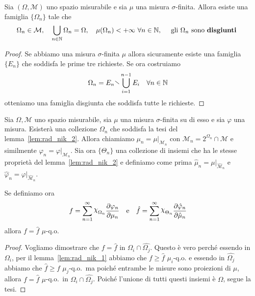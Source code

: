 \begin{lemma}\label{lem:rad_nik_2}
    Sia \({(\Omega, \mathcal{M})}\) uno spazio misurabile e sia \(\mu\) una
    misura \(\sigma\)-finita. Allora esiste una famiglia \(\{\Omega_n\}\) tale
    che 
    \[
        \Omega_n \in \mathcal{M}, \quad \bigcup_{n \in \mathbb{N}} \Omega_n =
        \Omega, \quad \mu(\Omega_n) < +\infty\,\, \forall n \in \mathbb{N}, \quad
        \text{ gli \(\Omega_{n}\) sono \textbf{disgiunti} }
    \]
\end{lemma}
\begin{proof}
    Se abbiamo una misura \(\sigma\)-finita \(\mu\) allora sicuramente esiste
    una famiglia \(\{E_{n}\} \) che soddisfa le prime tre richieste. Se ora
    costruiamo
    \[
        \Omega_{n} = E_{n} \sminus \bigcup_{i=1}^{n-1} E_{i} \quad \forall n \in \mathbb{N}
    \]
    otteniamo una famiglia disgiunta che soddisfa tutte le richieste.
\end{proof}

\begin{lemma}\label{lem:rad_nik_3}
    Sia \(\Omega, \mathcal{M}\) uno spazio misurabile, sia \(\mu\) una misura
    \(\sigma\)-finita su di esso e sia \(\varphi \) una misura. Esisterà una
    collezione \(\Omega_n\) che soddisfa la tesi del lemma~\ref{lem:rad_nik_2}.
    Allora chiamiamo \(\mu_n = \mu|_{\mathcal{M}_n} \) con \(\mathcal{M}_n =
    2^{\Omega_n} \cap \mathcal{M}\) e similmente \(\varphi_n = \varphi
    |_{\mathcal{M}_n} \). Sia ora \(\{\Theta_n\} \) una collezione di insiemi
    che ha le stesse proprietà del lemma~\ref{lem:rad_nik_2} e definiamo come
    prima \(\hat{\mu}_n = \mu|_{\hat{\mathcal{M}}_n} \) e \(\hat{\varphi}_n =
    \varphi|_{\hat{\mathcal{M}}_n} \). 

    Se definiamo ora
    \[
        f = \sum_{n=1}^{\infty} \rchi_{\Omega_n} \frac{\partial
        \varphi_n}{\partial \mu_n} \quad \text{e} \quad \hat{f} =
        \sum_{n=1}^{\infty} \rchi_{\Theta_n} \frac{\partial
        \hat{\varphi}_n}{\partial \hat{\mu}_n}
    \]
    allora \(f = \hat{f}\) \(\mu\)-q.o.
\end{lemma}
\begin{proof}
    Vogliamo dimostrare che \(f = \hat{f}\) in \(\Omega_{i} \cap
    \hat{\Omega_{j}}\). Questo è vero perché essendo in \(\Omega_{i}\), per il
    lemma~\ref{lem:rad_nik_1} abbiamo che \(f \ge \hat{f}\) \(\mu_i\)-q.o. e
    essendo in \(\hat{\Omega_{j}}\) abbiamo che \(\hat{f} \ge f\)
    \(\hat{\mu_{j}}\)-q.o.~ma poiché entrambe le misure sono proiezioni di
    \(\mu\), allora \(f = \hat{f}\) \(\mu\)-q.o.~in \(\Omega_{i} \cap
    \hat{\Omega_{j}}\). Poiché l'unione di tutti questi insiemi è \(\Omega\),
    segue la tesi.
\end{proof}


